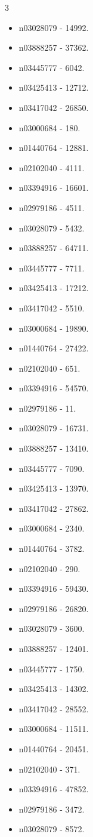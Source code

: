 \begin{multicols}{3}
\begin{itemize}
\item n03028079 - 14992.
\item n03888257 - 37362.
\item n03445777 - 6042.
\item n03425413 - 12712.
\item n03417042 - 26850.
\item n03000684 - 180.
\item n01440764 - 12881.
\item n02102040 - 4111.
\item n03394916 - 16601.
\item n02979186 - 4511.
\item n03028079 - 5432.
\item n03888257 - 64711.
\item n03445777 - 7711.
\item n03425413 - 17212.
\item n03417042 - 5510.
\item n03000684 - 19890.
\item n01440764 - 27422.
\item n02102040 - 651.
\item n03394916 - 54570.
\item n02979186 - 11.
\item n03028079 - 16731.
\item n03888257 - 13410.
\item n03445777 - 7090.
\item n03425413 - 13970.
\item n03417042 - 27862.
\item n03000684 - 2340.
\item n01440764 - 3782.
\item n02102040 - 290.
\item n03394916 - 59430.
\item n02979186 - 26820.
\item n03028079 - 3600.
\item n03888257 - 12401.
\item n03445777 - 1750.
\item n03425413 - 14302.
\item n03417042 - 28552.
\item n03000684 - 11511.
\item n01440764 - 20451.
\item n02102040 - 371.
\item n03394916 - 47852.
\item n02979186 - 3472.
\item n03028079 - 8572.

\end{itemize}
\end{multicols}
